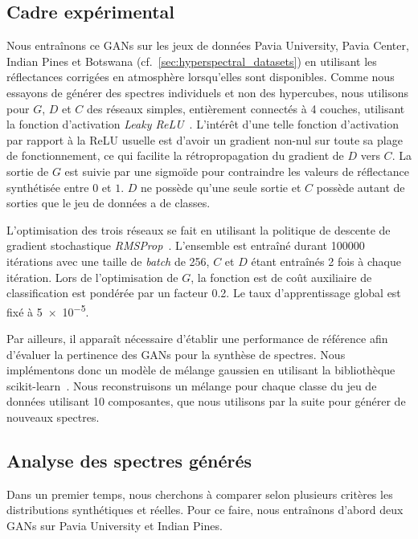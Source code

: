 \subsection{Cadre expérimental}
\label{sec:experimental_setup}

Nous entraînons ce \glspl{GAN} sur les jeux de données Pavia University, Pavia Center, Indian Pines et Botswana (cf.~\cref{sec:hyperspectral_datasets}) en utilisant les réflectances corrigées en atmosphère lorsqu'elles sont disponibles. Comme nous essayons de générer des spectres individuels et non des hypercubes, nous utilisons pour $G$, $D$ et $C$ des réseaux simples, entièrement connectés à 4 couches, utilisant la fonction d'activation \emph{Leaky \gls{ReLU}}~\cite{maas_rectifier_2013}. L'intérêt d'une telle fonction d'activation par rapport à la \gls{ReLU} usuelle est d'avoir un gradient non-nul sur toute sa plage de fonctionnement, ce qui facilite la rétropropagation du gradient de $D$ vers $C$. La sortie de $G$ est suivie par une sigmoïde pour contraindre les valeurs de réflectance synthétisée entre $0$ et $1$. $D$ ne possède qu'une seule sortie et $C$ possède autant de sorties que le jeu de données a de classes.

L'optimisation des trois réseaux se fait en utilisant la politique de descente de gradient stochastique \emph{RMSProp}~\cite{tielman_lecture_2012}. L'ensemble est entraîné durant \num{100000} itérations avec une taille de \emph{batch} de 256, $C$ et $D$ étant entraînés 2 fois à chaque itération. Lors de l'optimisation de $G$, la fonction est de coût auxiliaire de classification est pondérée par un facteur \num{0.2}. Le taux d'apprentissage global est fixé à \num{5e-5}.

Par ailleurs, il apparaît nécessaire d'établir une performance de référence afin d'évaluer la pertinence des \glspl{GAN} pour la synthèse de spectres. Nous implémentons donc un modèle de mélange gaussien en utilisant la bibliothèque scikit-learn~\cite{pedregosa_scikit-learn_2011}. Nous reconstruisons un mélange pour chaque classe du jeu de données utilisant 10 composantes, que nous utilisons par la suite pour générer de nouveaux spectres.

\subsection{Analyse des spectres générés}
\label{sec:analysis}

Dans un premier temps, nous cherchons à comparer selon plusieurs critères les distributions synthétiques et réelles. Pour ce faire, nous entraînons d'abord deux \glspl{GAN} sur Pavia University et Indian Pines.

